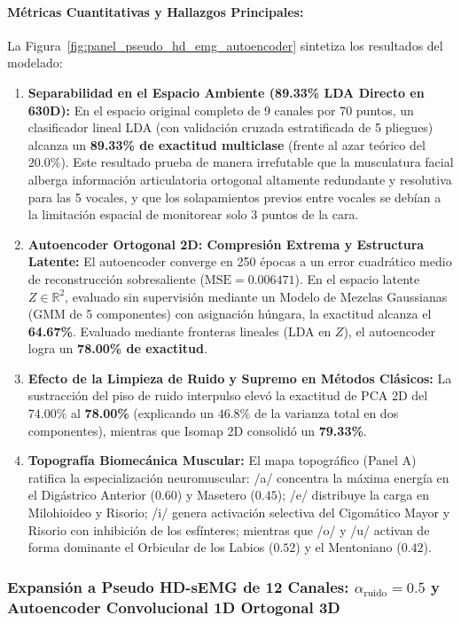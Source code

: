 \documentclass[11pt,a4paper]{article}
\begin{document}
\paragraph{Métricas Cuantitativas y Hallazgos Principales:}
La Figura~\ref{fig:panel_pseudo_hd_emg_autoencoder} sintetiza los resultados del modelado:
\begin{enumerate}
    \item \textbf{Separabilidad en el Espacio Ambiente (89.33\% LDA Directo en 630D):}
    En el espacio original completo de 9 canales por 70 puntos, un clasificador lineal LDA (con validación cruzada estratificada de 5 pliegues) alcanza un \textbf{89.33\% de exactitud multiclase} (frente al azar teórico del $20.0\%$). Este resultado prueba de manera irrefutable que la musculatura facial alberga información articulatoria ortogonal altamente redundante y resolutiva para las 5 vocales, y que los solapamientos previos entre vocales se debían a la limitación espacial de monitorear solo 3 puntos de la cara.
    \item \textbf{Autoencoder Ortogonal 2D: Compresión Extrema y Estructura Latente:}
    El autoencoder converge en 250 épocas a un error cuadrático medio de reconstrucción sobresaliente ($\text{MSE} = 0.006471$). En el espacio latente $Z \in \mathbb{R}^2$, evaluado sin supervisión mediante un Modelo de Mezclas Gaussianas (GMM de 5 componentes) con asignación húngara, la exactitud alcanza el \textbf{64.67\%}. Evaluado mediante fronteras lineales (LDA en $Z$), el autoencoder logra un \textbf{78.00\% de exactitud}.
    \item \textbf{Efecto de la Limpieza de Ruido y Supremo en Métodos Clásicos:}
    La sustracción del piso de ruido interpulso elevó la exactitud de PCA 2D del $74.00\%$ al \textbf{78.00\%} (explicando un $46.8\%$ de la varianza total en dos componentes), mientras que Isomap 2D consolidó un \textbf{79.33\%}.
    \item \textbf{Topografía Biomecánica Muscular:}
    El mapa topográfico (Panel A) ratifica la especialización neuromuscular: /a/ concentra la máxima energía en el Digástrico Anterior ($0.60$) y Masetero ($0.45$); /e/ distribuye la carga en Milohioideo y Risorio; /i/ genera activación selectiva del Cigomático Mayor y Risorio con inhibición de los esfínteres; mientras que /o/ y /u/ activan de forma dominante el Orbicular de los Labios ($0.52$) y el Mentoniano ($0.42$).
\end{enumerate}

\subsubsection{Expansión a Pseudo HD-sEMG de 12 Canales: $\alpha_{\text{ruido}}=0.5$ y Autoencoder Convolucional 1D Ortogonal 3D}
\label{subsubsec:pseudo_hd_emg_12ch_conv3d}
\end{document}

